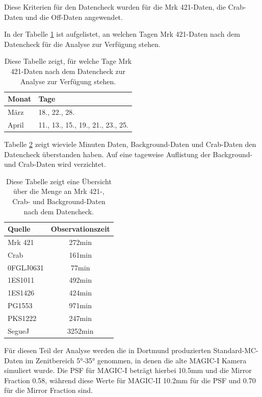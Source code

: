Diese Kriterien für den Datencheck wurden für die Mrk 421-Daten, die Crab-Daten und die Off-Daten angewendet.

In der Tabelle \ref{tab:Datenset2-Mrk421} ist aufgelistet, an welchen Tagen Mrk 421-Daten nach dem Datencheck für die Analyse zur Verfügung stehen.


\begin{table}[!h]
\centering
\caption{Diese Tabelle zeigt, für welche Tage Mrk 421-Daten nach dem Datencheck zur Analyse zur Verfügung stehen.}
\label{tab:Datenset2-Mrk421}
\begin{tabular}{ll}
  \toprule
  Monat & Tage\\
  \midrule
  \midrule
März & 18., 22., 28.\\
April & 11., 13., 15., 19., 21., 23., 25. \\
  \bottomrule
\end{tabular}
\end{table}

Tabelle \ref{tab:Datenset2} zeigt wieviele Minuten Daten, Background-Daten und Crab-Daten den Datencheck überstanden haben. 
Auf eine tageweise Auflistung der Background- und Crab-Daten wird verzichtet.

\begin{table}[!h]
\centering
\caption{Diese Tabelle zeigt eine Übersicht über die Menge an Mrk 421-, Crab- und Background-Daten nach dem Datencheck.}
\label{tab:Datenset2}
\begin{tabular}{lc}
  \toprule
  Quelle & Observationszeit\\
  \midrule
  \midrule
  Mrk 421 & 272min\\
  \midrule
  Crab & 161min\\
  \midrule
  0FGLJ0631 & 77min \\
  1ES1011 & 492min \\
  1ES1426 & 424min \\
  PG1553 & 971min \\
  PKS1222 & 247min \\
  SegueJ & 3252min \\
  \bottomrule
\end{tabular}
\end{table}

Für diesen Teil der Analyse werden die in Dortmund produzierten Standard-MC-Daten im Zenitbereich 5°-35° genommen, in denen die alte MAGIC-I Kamera simuliert wurde.
Die PSF für MAGIC-I beträgt hierbei 10.5mm und die Mirror Fraction 0.58, während diese Werte für MAGIC-II 10.2mm für die PSF und 0.70 für die Mirror Fraction sind.

